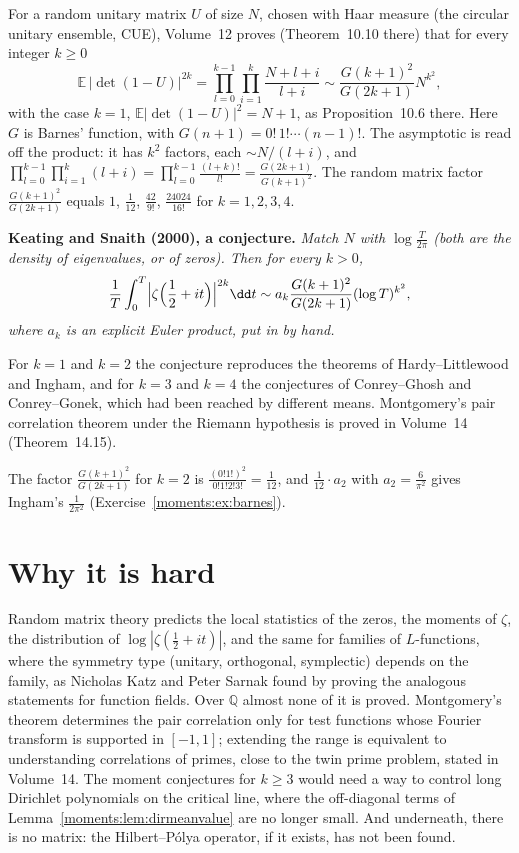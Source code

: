\begin{remark}\label{moments:rem:keatingsnaith}
For a random unitary matrix $U$ of size $N$, chosen with Haar measure (the circular unitary ensemble, CUE), Volume~12 proves (Theorem~10.10 there) that for every integer $k\ge0$
\[
\mathbb E\,|\det(1-U)|^{2k}=\prod_{l=0}^{k-1}\prod_{i=1}^k\frac{N+l+i}{l+i}\sim\frac{G(k+1)^2}{G(2k+1)}N^{k^2},
\]
with the case $k=1$, $\mathbb E|\det(1-U)|^2=N+1$, as Proposition~10.6 there. Here $G$ is Barnes' function, with $G(n+1)=0!\,1!\cdots(n-1)!$. The asymptotic is read off the product: it has $k^2$ factors, each $\sim N/(l+i)$, and $\prod_{l=0}^{k-1}\prod_{i=1}^k(l+i)=\prod_{l=0}^{k-1}\frac{(l+k)!}{l!}=\frac{G(2k+1)}{G(k+1)^2}$. The random matrix factor $\frac{G(k+1)^2}{G(2k+1)}$ equals $1$, $\frac1{12}$, $\frac{42}{9!}$, $\frac{24024}{16!}$ for $k=1,2,3,4$.
\end{remark}

\medskip\noindent\textbf{Keating and Snaith (2000), a conjecture.} \emph{Match $N$ with $\log\frac T{2\pi}$ (both are the density of eigenvalues, or of zeros). Then for every $k>0$,
\[
\frac1T\int_0^T\Bigl|\zeta\Bigl(\frac12+it\Bigr)\Bigr|^{2k}\dd t\sim a_k\frac{G(k+1)^2}{G(2k+1)}(\log T)^{k^2},
\]
where $a_k$ is an explicit Euler product, put in by hand.}

\medskip
For $k=1$ and $k=2$ the conjecture reproduces the theorems of Hardy--Littlewood and Ingham, and for $k=3$ and $k=4$ the conjectures of Conrey--Ghosh and Conrey--Gonek, which had been reached by different means. Montgomery's pair correlation theorem under the Riemann hypothesis is proved in Volume~14 (Theorem~14.15).

The factor $\frac{G(k+1)^2}{G(2k+1)}$ for $k=2$ is $\frac{(0!1!)^2}{0!1!2!3!}=\frac1{12}$, and $\frac1{12}\cdot a_2$ with $a_2=\frac6{\pi^2}$ gives Ingham's
$\frac1{2\pi^2}$ (Exercise~\ref{moments:ex:barnes}).

\section{Why it is hard}

Random matrix theory predicts the local statistics of the zeros, the moments of $\zeta$, the distribution of $\log|\zeta(\frac12+it)|$, and the same
for families of $L$-functions, where the symmetry type (unitary, orthogonal, symplectic) depends on the family, as Nicholas Katz and Peter Sarnak found by
proving the analogous statements for function fields. Over $\mathbb Q$ almost none of it is proved. Montgomery's theorem determines the pair correlation only
for test functions whose Fourier transform is supported in $[-1,1]$; extending the range is equivalent to understanding correlations of primes, close to
the twin prime problem, stated in Volume~14. The moment conjectures for $k\ge3$ would need a way to control long Dirichlet polynomials on the
critical line, where the off-diagonal terms of Lemma~\ref{moments:lem:dirmeanvalue} are no longer small. And underneath, there is no matrix: the
Hilbert--P\'olya operator, if it exists, has not been found.

